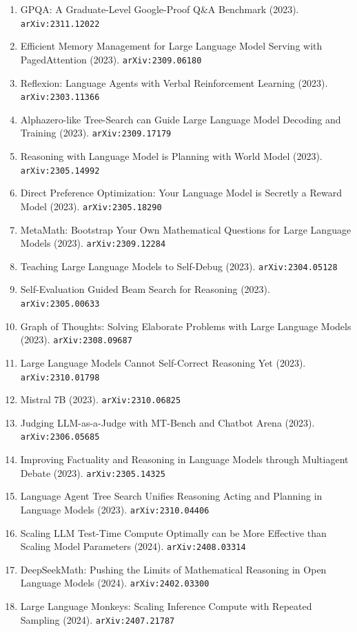 \documentclass[11pt]{article}
\begin{document}
\begin{enumerate}
  Annotations (2023). \texttt{arXiv:2312.08935}
  \item GPQA: A Graduate-Level Google-Proof Q\&A Benchmark (2023). \texttt{arXiv:2311.12022}
  \item Efficient Memory Management for Large Language Model Serving with
  PagedAttention (2023). \texttt{arXiv:2309.06180}
  \item Reflexion: Language Agents with Verbal Reinforcement Learning (2023). \texttt{arXiv:2303.11366}
  \item Alphazero-like Tree-Search can Guide Large Language Model Decoding and
  Training (2023). \texttt{arXiv:2309.17179}
  \item Reasoning with Language Model is Planning with World Model (2023). \texttt{arXiv:2305.14992}
  \item Direct Preference Optimization: Your Language Model is Secretly a Reward
  Model (2023). \texttt{arXiv:2305.18290}
  \item MetaMath: Bootstrap Your Own Mathematical Questions for Large Language
  Models (2023). \texttt{arXiv:2309.12284}
  \item Teaching Large Language Models to Self-Debug (2023). \texttt{arXiv:2304.05128}
  \item Self-Evaluation Guided Beam Search for Reasoning (2023). \texttt{arXiv:2305.00633}
  \item Graph of Thoughts: Solving Elaborate Problems with Large Language Models (2023). \texttt{arXiv:2308.09687}
  \item Large Language Models Cannot Self-Correct Reasoning Yet (2023). \texttt{arXiv:2310.01798}
  \item Mistral 7B (2023). \texttt{arXiv:2310.06825}
  \item Judging LLM-as-a-Judge with MT-Bench and Chatbot Arena (2023). \texttt{arXiv:2306.05685}
  \item Improving Factuality and Reasoning in Language Models through Multiagent
  Debate (2023). \texttt{arXiv:2305.14325}
  \item Language Agent Tree Search Unifies Reasoning Acting and Planning in
  Language Models (2023). \texttt{arXiv:2310.04406}
  \item Scaling LLM Test-Time Compute Optimally can be More Effective than
  Scaling Model Parameters (2024). \texttt{arXiv:2408.03314}
  \item DeepSeekMath: Pushing the Limits of Mathematical Reasoning in Open
  Language Models (2024). \texttt{arXiv:2402.03300}
  \item Large Language Monkeys: Scaling Inference Compute with Repeated Sampling (2024). \texttt{arXiv:2407.21787}

\end{enumerate}
\end{document}
